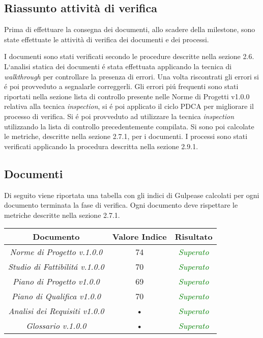 \subsection{Riassunto attività di verifica}

Prima di effettuare la consegna dei documenti, allo scadere della milestone, sono state effettuate le attività di verifica dei documenti e dei processi.

I documenti sono stati verificati secondo le procedure descritte nella sezione 2.6.
L`analisi statica dei documenti \'e stata effettuata applicando la tecnica di \textit{walkthrough} per controllare la presenza di errori. Una volta riscontrati gli errori si \'e poi provveduto a segnalarle correggerli. Gli errori pi\'u frequenti sono stati riportati nella sezione lista di controllo presente nelle Norme di Progetti v1.0.0 relativa alla tecnica \textit{inspection}, si \'e poi applicato il ciclo PDCA per migliorare il processo di verifica.
Si \'e poi provveduto ad utilizzare la tecnica \textit{inspection} utilizzando la lista di controllo precedentemente compilata.
Si sono poi calcolate le metriche, descritte nella sezione 2.7.1, per i documenti.
I processi sono stati verificati applicando la procedura descritta nella sezione 2.9.1.

\subsection{Documenti}

Di seguito viene riportata una tabella con gli indici di Gulpease calcolati per ogni documento terminata la fase di verifica.
Ogni documento deve rispettare le metriche descritte nella sezione 2.7.1.\\

\hspace{1cm}

\begin{center}
\begin{tabular}{|c|c|c|}
\hline 
\textbf{Documento} & \textbf{Valore Indice} & \textbf{Risultato} \\ 
\hline
\textit{Norme di Progetto v.1.0.0} & 74 & \textcolor{green}{\textit{Superato}} \\ 
\textit{Studio di Fattibilit\'a v.1.0.0} & 70 & \textcolor{green}{\textit{Superato}} \\ 
\textit{Piano di Progetto v1.0.0} & 69 & \textcolor{green}{\textit{Superato}} \\ 
\textit{Piano di Qualifica v1.0.0} & 70 & \textcolor{green}{\textit{Superato}} \\ 
\textit{Analisi dei Requisiti v1.0.0} & • & \textcolor{green}{\textit{Superato}} \\ 
\textit{Glossario v.1.0.0} & • & \textcolor{green}{\textit{Superato}} \\ 
\hline 
\end{tabular}

\end{center}